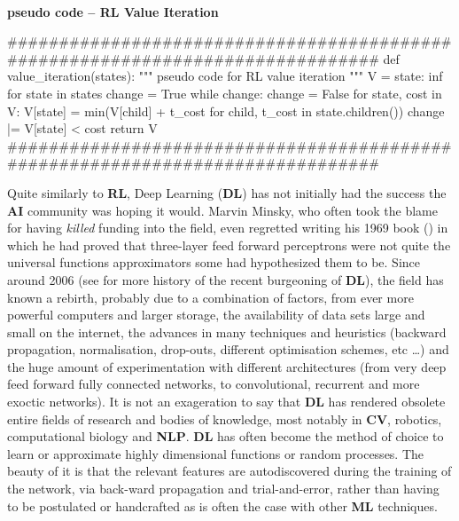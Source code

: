 \paragraph{}{\textbf{pseudo code -- \textbf{RL} Value Iteration}}
\begin{pseudocode}
###############################################################################
def value_iteration(states):
    """ pseudo code for RL value iteration """
    V = {state: inf for state in states}
    change = True
    while change:
        change = False
        for state, cost in V:
            V[state] = min(V[child] + t_cost for child, t_cost in state.children())
            change |= V[state] < cost
    return V 
###############################################################################
\end{pseudocode}
\black






Quite similarly to \textbf{RL}, Deep Learning (\textbf{DL}) has not initially had the success the \textbf{AI} community was hoping it would. Marvin Minsky, who often took the blame for having \textit{killed} funding into the field, even regretted writing his 1969 book (\cite{minskypapert69}) in which he had proved that three-layer feed forward perceptrons were not quite the universal functions approximators some had hypothesized them to be. Since around 2006 (see \cite{GoodBengCour16} for more history of the recent burgeoning of \textbf{DL}), the field has known a rebirth, probably due to a combination of factors, from ever more powerful computers and larger storage, the availability of data sets large and small on the internet, the advances in many techniques and heuristics (backward propagation, normalisation, drop-outs, different optimisation schemes, etc \dots) and the huge amount of experimentation with different architectures (from very deep feed forward fully connected networks, to convolutional, recurrent and more exoctic networks). It is not an exageration to say that \textbf{DL} has rendered obsolete entire fields of research and bodies of knowledge, most notably in \textbf{CV}, robotics, computational biology and \textbf{NLP}. \textbf{DL} has often become the method of choice to learn or approximate highly dimensional functions or random processes. The beauty of it is that the relevant features are autodiscovered during the training of the network, via back-ward propagation and trial-and-error, rather than having to be postulated or handcrafted as is often the case with other \textbf{ML} techniques.

